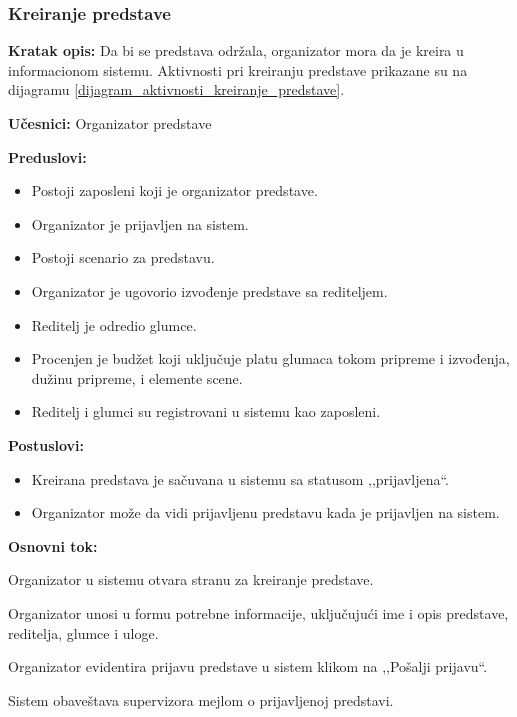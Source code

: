 \documentclass[a4paper]{article}
\begin{document}
\subsubsection{Kreiranje predstave} \label{Kreiranje predstave}
\noindent\textbf{Kratak opis:} Da bi se predstava održala, organizator mora da je kreira u informacionom sistemu. Aktivnosti pri kreiranju predstave prikazane su na dijagramu \ref{dijagram_aktivnosti_kreiranje_predstave}.

\noindent\textbf{Učesnici:} Organizator predstave

\noindent\textbf{Preduslovi:}
  \begin{itemize}
    \item Postoji zaposleni koji je organizator predstave.
    \item Organizator je prijavljen na sistem.
    \item Postoji scenario za predstavu.
    \item Organizator je ugovorio izvođenje predstave sa rediteljem.
    \item Reditelj je odredio glumce.
    \item Procenjen je budžet koji uključuje platu glumaca tokom pripreme i izvođenja, dužinu pripreme, i elemente scene.
    \item Reditelj i glumci su registrovani u sistemu kao zaposleni.
  \end{itemize}

\noindent\textbf{Postuslovi:} 
  \begin{itemize}
    \item Kreirana predstava je sačuvana u sistemu sa statusom ,,prijavljena``.
    \item Organizator može da vidi prijavljenu predstavu kada je prijavljen na sistem.
  \end{itemize}

\noindent\textbf{Osnovni tok:}
  \begin{legal}
    \item Organizator u sistemu otvara stranu za kreiranje predstave.
    \item Organizator unosi u formu potrebne informacije, uključujući ime i opis predstave, reditelja, glumce i uloge. 
    \item Organizator evidentira prijavu predstave u sistem klikom na ,,Pošalji prijavu``. 
    \item Sistem obaveštava supervizora mejlom o prijavljenoj predstavi.
  \end{legal}
\end{document}
